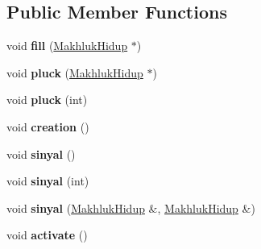 \subsection*{Public Member Functions}
\begin{DoxyCompactItemize}
\item 
void {\bfseries fill} (\hyperlink{class_makhluk_hidup}{Makhluk\+Hidup} $\ast$)\hypertarget{class_administrator_makhluk_hidup_a73f1c4f851ace0e6e5d4dda99ca1a963}{}\label{class_administrator_makhluk_hidup_a73f1c4f851ace0e6e5d4dda99ca1a963}

\item 
void {\bfseries pluck} (\hyperlink{class_makhluk_hidup}{Makhluk\+Hidup} $\ast$)\hypertarget{class_administrator_makhluk_hidup_a0766cdee6be5104128c72a6ddbc6de19}{}\label{class_administrator_makhluk_hidup_a0766cdee6be5104128c72a6ddbc6de19}

\item 
void {\bfseries pluck} (int)\hypertarget{class_administrator_makhluk_hidup_a5faae20a3dfedeab6432ab0a251a7533}{}\label{class_administrator_makhluk_hidup_a5faae20a3dfedeab6432ab0a251a7533}

\item 
void {\bfseries creation} ()\hypertarget{class_administrator_makhluk_hidup_ae3f91267f48512035d37ea6c6b93c668}{}\label{class_administrator_makhluk_hidup_ae3f91267f48512035d37ea6c6b93c668}

\item 
void {\bfseries sinyal} ()\hypertarget{class_administrator_makhluk_hidup_a9c62c4de8062108c6e7f08fc685c1e12}{}\label{class_administrator_makhluk_hidup_a9c62c4de8062108c6e7f08fc685c1e12}

\item 
void {\bfseries sinyal} (int)\hypertarget{class_administrator_makhluk_hidup_a19b242132b86ca2f3dfa2b9b1e319c33}{}\label{class_administrator_makhluk_hidup_a19b242132b86ca2f3dfa2b9b1e319c33}

\item 
void {\bfseries sinyal} (\hyperlink{class_makhluk_hidup}{Makhluk\+Hidup} \&, \hyperlink{class_makhluk_hidup}{Makhluk\+Hidup} \&)\hypertarget{class_administrator_makhluk_hidup_a33f004af59623d009bf6f2966cb0645b}{}\label{class_administrator_makhluk_hidup_a33f004af59623d009bf6f2966cb0645b}

\item 
void {\bfseries activate} ()\hypertarget{class_administrator_makhluk_hidup_a6011316c3ae3ffd8502f27ad3c216ac7}{}\label{class_administrator_makhluk_hidup_a6011316c3ae3ffd8502f27ad3c216ac7}


\end{DoxyCompactItemize}

